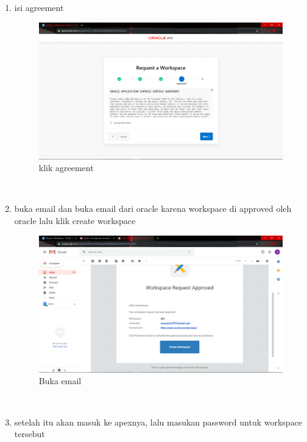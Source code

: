\begin{enumerate}
\item isi agreement

\begin{figure}[H]
    \centering
    \includegraphics[scale=0.2]{figures/6}
    \caption{klik agreement}
    \label{Figureanaconda5}
\end{figure} \\


\item buka email dan buka email dari oracle karena workspace di approved oleh oracle lalu klik create workspace
\begin{figure}[H]
    \centering
    \includegraphics[scale=0.2]{figures/7}
    \caption{Buka email}
    \label{Figureanaconda6}
\end{figure} \\

\item setelah itu akan masuk ke apexnya, lalu masukan password untuk workspace tersebut


\end{enumerate}
